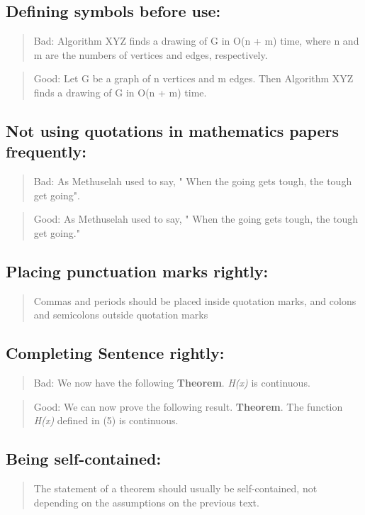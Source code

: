 \documentclass[]{report}
\begin{document}
\subsection{Defining symbols before use: }
\begin{verse}
{\large Bad:} Algorithm XYZ finds a drawing of G in
O(n + m) time, where n and m are the
numbers of vertices and edges, respectively.
\end{verse}
\begin{verse}
{\large Good:} Let G be a graph of n vertices and m edges.
Then Algorithm XYZ finds a drawing of G in
O(n + m) time.
\end{verse}

\subsection{Not using quotations in mathematics papers frequently:}
\begin{verse}
{\large Bad:} As Methuselah used to say, " When the going
gets tough, the tough get going".
\end{verse}
\begin{verse}
{\large Good:} As Methuselah used to say, " When the going
gets tough, the tough get going."
\end{verse}

\subsection{Placing punctuation marks rightly:}
\begin{verse}
Commas and periods should be placed inside quotation
marks, and colons and semicolons outside quotation
marks
\end{verse}

\subsection{Completing Sentence rightly:}
\begin{verse}
{\large Bad:} We now have the following
\textbf{Theorem}. \emph {H(x)} is continuous.
\end{verse}
\begin{verse}
{\large Good:} We can now prove the following result.
\textbf {Theorem}. The function \emph {H(x)} defined in (5) is
continuous.
\end{verse}

\subsection{Being self-contained: }
\begin{verse}
The statement of a theorem should usually be
self-contained, not depending on the assumptions on the
previous text.
\end {verse}
\end{document}
